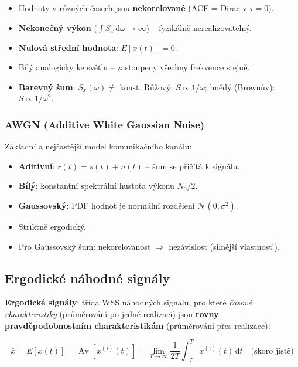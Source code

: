 \documentclass[12pt,a4paper]{article}
\newcommand{\Av}{\operatorname{Av}}
\newcommand{\dd}{\mathrm{d}}
\begin{document}
\begin{itemize}
  \item Hodnoty v různých časech jsou \textbf{nekorelované} (ACF = Dirac v $\tau = 0$).
  \item \textbf{Nekonečný výkon} ($\int S_x\,\dd\omega \to \infty$) – fyzikálně nerealizovatelný.
  \item \textbf{Nulová střední hodnota}: $E[x(t)] = 0$.
  \item Bílý analogicky ke světlu – zastoupeny všechny frekvence stejně.
  \item \textbf{Barevný šum}: $S_x(\omega) \neq$ konst. Růžový: $S \propto 1/\omega$; hnědý (Brownův): $S \propto 1/\omega^2$.
\end{itemize}

\subsubsection*{AWGN (Additive White Gaussian Noise)}

Základní a nejčastější model komunikačního kanálu:
\begin{itemize}
  \item \textbf{Aditivní}: $r(t) = s(t) + n(t)$ – šum se přičítá k signálu.
  \item \textbf{Bílý}: konstantní spektrální hustota výkonu $N_0/2$.
  \item \textbf{Gaussovský}: PDF hodnot je normální rozdělení $\mathcal{N}(0, \sigma^2)$.
  \item Striktně ergodický.
  \item Pro Gaussovský šum: nekorelovanost $\Rightarrow$ nezávislost (silnější vlastnost!).
\end{itemize}

\begin{hvezdBox}
\subsection*{Ergodické náhodné signály}
\end{hvezdBox}

\textbf{Ergodické signály}: třída WSS náhodných signálů, pro které \emph{časové charakteristiky} (průměrování po jedné realizaci) jsou \textbf{rovny pravděpodobnostním charakteristikám} (průměrování přes realizace):

\begin{matBox}
\[
  \bar{x} = E[x(t)] = \Av[x^{(i)}(t)] = \lim_{T\to\infty}\frac{1}{2T}\int_{-T}^{T}x^{(i)}(t)\,\dd t \quad\text{(skoro jistě)}
\]
\end{matBox}
\end{document}
